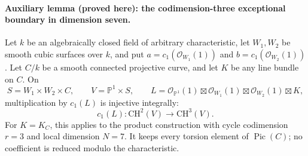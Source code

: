 \paragraph{Auxiliary lemma (proved here): the codimension-three exceptional boundary in dimension seven.}
Let $k$ be an algebraically closed field of arbitrary characteristic,
let $W_1,W_2$ be smooth cubic surfaces over $k$, and put
$a=c_1(\mathcal O_{W_1}(1))$ and
$b=c_1(\mathcal O_{W_2}(1))$. Let $C/k$ be a smooth connected
projective curve, and let $K$ be any line bundle on $C$. On
\[
 S=W_1\times W_2\times C,\qquad V=\mathbb P^1\times S,
 \qquad L=\mathcal O_{\mathbb P^1}(1)
            \boxtimes\mathcal O_{W_1}(1)
            \boxtimes\mathcal O_{W_2}(1)\boxtimes K,
\]
multiplication by $c_1(L)$ is injective integrally:
\[
 c_1(L):\mathrm{CH}^2(V)\longrightarrow\mathrm{CH}^3(V).
 \tag{EC.1}
\]
For $K=K_C$, this applies to the product construction with
cycle codimension $r=3$ and local dimension $N=7$.
It keeps every torsion element of $\operatorname{Pic}(C)$; no
coefficient is reduced modulo the characteristic.

